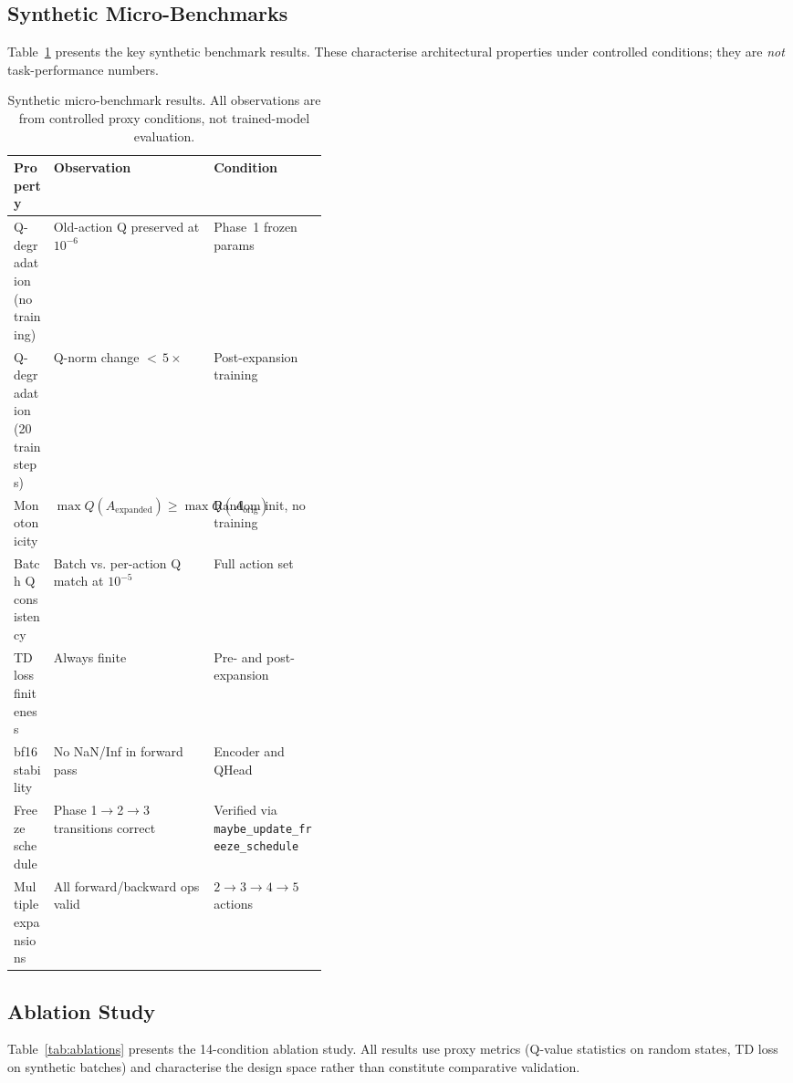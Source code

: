 \documentclass{article}
\begin{document}
\subsection{Synthetic Micro-Benchmarks}

Table~\ref{tab:benchmarks} presents the key synthetic benchmark results. These
characterise architectural properties under controlled conditions; they are
\emph{not} task-performance numbers.

\begin{table}[h]
  \centering
  \caption{Synthetic micro-benchmark results. All observations are from
  controlled proxy conditions, not trained-model evaluation.}
  \label{tab:benchmarks}
  \begin{tabular}{lp{0.4\linewidth}l}
    \toprule
    \textbf{Property} & \textbf{Observation} & \textbf{Condition} \\
    \midrule
    Q-degradation (no training) &
      Old-action Q preserved at $10^{-6}$ &
      Phase~1 frozen params \\
    Q-degradation (20 train steps) &
      Q-norm change ${<}\,5\times$ &
      Post-expansion training \\
    Monotonicity &
      $\max Q(A_\text{expanded}) \geq \max Q(A_\text{orig})$ &
      Random init, no training \\
    Batch Q consistency &
      Batch vs. per-action Q match at $10^{-5}$ &
      Full action set \\
    TD loss finiteness &
      Always finite &
      Pre- and post-expansion \\
    bf16 stability &
      No NaN/Inf in forward pass &
      Encoder and QHead \\
    Freeze schedule &
      Phase 1$\to$2$\to$3 transitions correct &
      Verified via
      \texttt{maybe\_update\_freeze\_schedule} \\
    Multiple expansions &
      All forward/backward ops valid &
      $2 \to 3 \to 4 \to 5$ actions \\
    \bottomrule
  \end{tabular}
\end{table}

\subsection{Ablation Study}

Table~\ref{tab:ablations} presents the 14-condition ablation study. All
results use proxy metrics (Q-value statistics on random states, TD loss on
synthetic batches) and characterise the design space rather than constitute
comparative validation.
\end{document}
